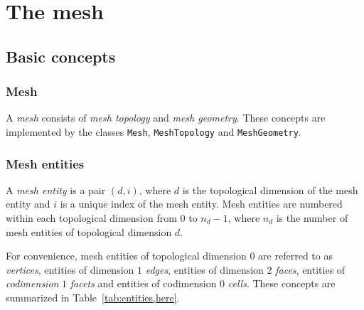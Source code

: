 \chapter{The mesh}



\newpage

\section{Basic concepts}

\subsection{Mesh}

A \emph{mesh} consists of \emph{mesh topology} and \emph{mesh geometry}.
These concepts are implemented by the classes \texttt{Mesh},
\texttt{MeshTopology} and \texttt{MeshGeometry}.

\subsection{Mesh entities}

A \emph{mesh entity} is a pair $(d, i)$, where $d$ is the topological
dimension of the mesh entity and $i$ is a unique index of the mesh
entity. Mesh entities are numbered within each topological dimension
from $0$ to $n_d-1$, where $n_d$ is the number of mesh entities of
topological dimension $d$.

For convenience, mesh entities of topological dimension $0$ are
referred to as \emph{vertices}, entities of dimension $1$
\emph{edges}, entities of dimension $2$ \emph{faces}, entities of
\emph{codimension} $1$ \emph{facets} and entities of codimension $0$
\emph{cells}. These concepts are summarized in
Table~\ref{tab:entities,here}.

